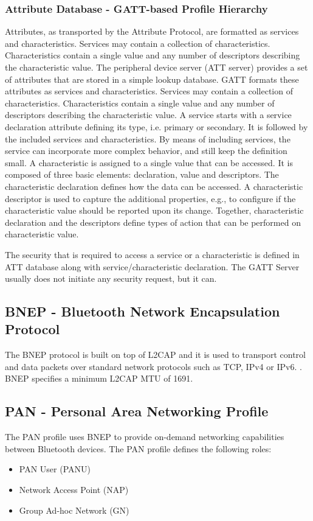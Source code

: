 \subsubsection{Attribute Database - GATT-based Profile Hierarchy}
Attributes, as transported by the Attribute Protocol, are formatted as services and characteristics. Services may contain a collection of characteristics. Characteristics contain a single value and any number of descriptors describing the characteristic value. The peripheral device server (ATT server) provides a set of attributes that are stored in a simple lookup database. GATT formats these attributes as services and characteristics. Services may contain a collection of characteristics. Characteristics contain a single value and any number of descriptors describing the characteristic value. A service starts with a service declaration attribute defining its type, i.e. primary or secondary. It is followed by the included services and characteristics. By means of including services, the service can incorporate more complex behavior, and still keep the definition small. A characteristic is assigned to a single value that can be accessed. It is composed of three basic elements: declaration, value and descriptors. The characteristic declaration defines how the data can be accessed. A characteristic descriptor is used to capture the additional properties, e.g., to configure if the characteristic value should be reported upon its change. Together, characteristic declaration and the descriptors define types of action that can be performed on characteristic value.

The security that is required to access a service or a characteristic is defined in ATT database along with service/characteristic declaration. The GATT Server usually does not initiate any security request, but it can. 

\subsection{BNEP -  Bluetooth Network Encapsulation Protocol}
The BNEP protocol is built on top of L2CAP and it is used to transport control and data packets over standard network protocols such as TCP, IPv4 or IPv6.  . BNEP specifies a minimum L2CAP MTU of 1691. 

\subsection{PAN -  Personal Area Networking Profile}
The PAN profile uses BNEP to provide on-demand networking capabilities between Bluetooth devices. The PAN profile defines the following roles:
\begin{itemize}
\item PAN User (PANU)
\item Network Access Point (NAP)
\item Group Ad-hoc Network (GN)
\end{itemize}

